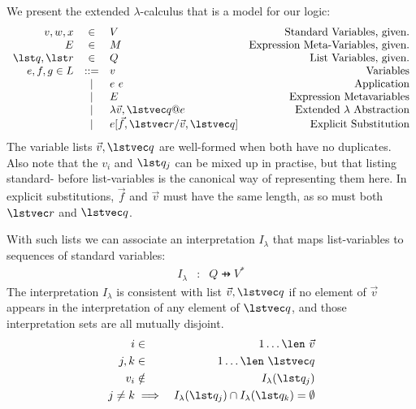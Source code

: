 We present the extended $\lambda$-calculus that is a model for our logic:
$$\begin{array}{rclr}
   v,w,x &\in& V & \mbox{Standard Variables, given.}
\\ E &\in& M & \mbox{Expression Meta-Variables, given.}
\\ \lst q,\lst r &\in& Q & \mbox{List Variables, given.}
\\ e,f,g \in L
   &::=& v  & \mbox{Variables}
\\ &|& e~e  & \mbox{Application}
\\ &|& E & \mbox{Expression Metavariables}
\\ &|& \lambda \vec v,\lstvec q @ e & \mbox{Extended $\lambda$ Abstraction} 
\\ &|& e[\vec f,\lstvec r/\vec v,\lstvec q] & \mbox{Explicit Substitution}
\end{array}$$
The variable lists $\vec v,\lstvec q$ are well-formed when both have no duplicates.
Also note that the $v_i$ and $\lst q_j$ can be mixed up in practise,
but that listing standard- before list-variables is the canonical way
of representing them here.
In explicit substitutions, $\vec f$ and $\vec v$ must have the same length,
as so must both $\lstvec r$ and $\lstvec q$.

With such lists we can associate an interpretation $I_{\lambda}$ that maps list-variables
to sequences of standard variables:
\begin{eqnarray*}
   I_{\lambda} &:& Q \pfun V^*
\end{eqnarray*}
The interpretation $I_{\lambda}$ is consistent 
with list $\vec v,\lstvec q$ if no element of $\vec v$ appears in
the interpretation of any element of $\lstvec q$,
and those interpretation sets are all mutually disjoint.
\begin{eqnarray*}
  i &\in& 1 \ldots \len~ \vec v
\\ j,k &\in& 1 \ldots \len~ \lstvec q
\\ v_i &\notin& I_{\lambda}(\lst q_j)
\\ j\neq k &\implies& I_{\lambda}(\lst q_j) \cap I_{\lambda}(\lst q_k) = \emptyset
\end{eqnarray*}

